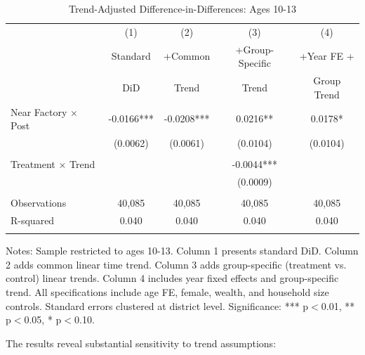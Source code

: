 \begin{table}[H]
\centering
\caption{Trend-Adjusted Difference-in-Differences: Ages 10-13}
\label{tab:trend_adjusted}
\begin{threeparttable}
\begin{tabular}{lcccc}
\toprule
& (1) & (2) & (3) & (4) \\
& Standard & +Common & +Group-Specific & +Year FE + \\
& DiD & Trend & Trend & Group Trend \\
\midrule
Near Factory $\times$ Post & -0.0166*** & -0.0208*** & 0.0216** & 0.0178* \\
& (0.0062) & (0.0061) & (0.0104) & (0.0104) \\
& & & & \\
Treatment $\times$ Trend & & & -0.0044*** & \\
& & & (0.0009) & \\
\\
\midrule
Observations & 40,085 & 40,085 & 40,085 & 40,085 \\
R-squared & 0.040 & 0.040 & 0.040 & 0.040 \\
\\
\bottomrule
\end{tabular}
\begin{tablenotes}
\footnotesize
\item Notes: Sample restricted to ages 10-13. Column 1 presents standard DiD. Column 2 adds common linear time trend. Column 3 adds group-specific (treatment vs. control) linear trends. Column 4 includes year fixed effects and group-specific trend. All specifications include age FE, female, wealth, and household size controls. Standard errors clustered at district level. Significance: *** p$<$0.01, ** p$<$0.05, * p$<$0.10.
\end{tablenotes}
\end{threeparttable}
\end{table}

The results reveal substantial sensitivity to trend assumptions:

